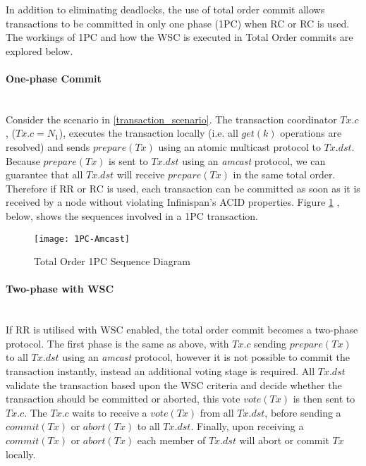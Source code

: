 	    In addition to eliminating deadlocks,  the use of total order commit allows transactions to be committed in only one phase (1PC) when RC or RC is used.  The workings of 1PC and how the WSC is executed in Total Order commits are explored below.  
	    
	        \paragraph{One-phase Commit} \hspace{0pt} \\
	        Consider the scenario in \ref{transaction_scenario}.  The transaction coordinator $Tx.c$, ($Tx.c = N_1$), executes the transaction locally (i.e. all $get(k)$ operations are resolved) and sends $prepare(Tx)$ using an atomic multicast protocol to $Tx.dst$.  Because $prepare(Tx)$ is sent to $Tx.dst$ using an \emph{amcast} protocol, we can guarantee that all $Tx.dst$ will receive $prepare(Tx)$ in the same total order.  Therefore if RR or RC is used, each transaction can be committed as soon as it is received by a node without violating Infinispan's ACID properties.  Figure \ref{fig:total_order_1PC} , below, shows the sequences involved in a 1PC transaction.  
	        
            \begin{figure}[htbp!] 
                \centering    
                \texttt{[image: 1PC-Amcast]}
                \caption[Total Order One-phase Commit Protocol]{Total Order 1PC Sequence Diagram}
                \label{fig:total_order_1PC}
            \end{figure}	        
	        
		        
			\paragraph{Two-phase with WSC} \hspace{0pt} \\        
	        If RR is utilised with WSC enabled, the total order commit becomes a two-phase protocol.  The first phase is the same as above, with $Tx.c$ sending $prepare(Tx)$ to all $Tx.dst$ using an \emph{amcast} protocol, however it is not possible to commit the transaction instantly, instead an additional voting stage is required.  All $Tx.dst$ validate the transaction based upon the WSC criteria and decide whether the transaction should be committed or aborted, this vote $vote(Tx)$ is then sent to $Tx.c$.  The $Tx.c$ waits to receive a $vote(Tx)$ from all $Tx.dst$, before sending a $commit(Tx)$ or $abort(Tx)$ to all $Tx.dst$.  Finally, upon receiving a $commit(Tx)$ or $abort(Tx)$ each member of $Tx.dst$ will abort or commit $Tx$ locally.          
	        
